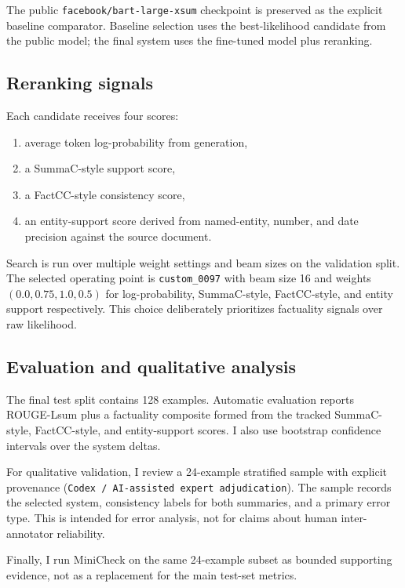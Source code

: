 \documentclass[11pt]{article}
\begin{document}
The public \texttt{facebook/bart-large-xsum} checkpoint is preserved as the
explicit baseline comparator. Baseline selection uses the best-likelihood
candidate from the public model; the final system uses the fine-tuned model
plus reranking.

\subsection{Reranking signals}

Each candidate receives four scores:
\begin{enumerate}[leftmargin=*,itemsep=0.2ex]
\item average token log-probability from generation,
\item a SummaC-style support score,
\item a FactCC-style consistency score,
\item an entity-support score derived from named-entity, number, and date
precision against the source document.
\end{enumerate}

Search is run over multiple weight settings and beam sizes on the validation
split. The selected operating point is \texttt{custom\_0097} with beam size 16
and weights
$(0.0, 0.75, 1.0, 0.5)$ for log-probability, SummaC-style, FactCC-style, and
entity support respectively. This choice deliberately prioritizes factuality
signals over raw likelihood.

\subsection{Evaluation and qualitative analysis}

The final test split contains 128 examples. Automatic evaluation reports
ROUGE-Lsum \citep{lin2004rouge} plus a factuality composite formed from the
tracked SummaC-style, FactCC-style, and entity-support scores. I also use
bootstrap confidence intervals over the system deltas.

For qualitative validation, I review a 24-example stratified sample with
explicit provenance (\texttt{Codex / AI-assisted expert adjudication}). The
sample records the selected system, consistency labels for both summaries, and
a primary error type. This is intended for error analysis, not for claims
about human inter-annotator reliability.

Finally, I run MiniCheck on the same 24-example subset as bounded supporting
evidence, not as a replacement for the main test-set metrics.
\end{document}
